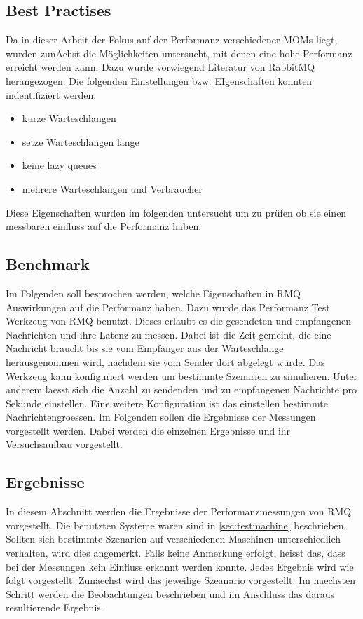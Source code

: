 \subsection{Best Practises}
Da in dieser Arbeit der Fokus auf der Performanz verschiedener MOMs liegt, wurden zunÄchst die Möglichkeiten untersucht, mit denen eine hohe Performanz erreicht werden kann. Dazu wurde vorwiegend Literatur von RabbitMQ herangezogen. Die folgenden Einstellungen bzw. EIgenschaften konnten indentifiziert werden.
\begin{itemize}
    \item kurze Warteschlangen
    \item setze Warteschlangen länge
    \item keine lazy queues
    \item mehrere Warteschlangen und Verbraucher
\end{itemize}
Diese Eigenschaften wurden im folgenden untersucht um zu prüfen ob sie einen messbaren einfluss auf die Performanz haben.
\subsection{Benchmark}
Im Folgenden soll besprochen werden, welche Eigenschaften in RMQ Auswirkungen auf die Performanz haben. Dazu wurde das Performanz Test Werkzeug von RMQ benutzt. Dieses erlaubt es die gesendeten und empfangenen Nachrichten und ihre Latenz zu messen. Dabei ist die Zeit gemeint, die eine Nachricht braucht bis sie vom Empfänger aus der Warteschlange herausgenommen wird, nachdem sie vom Sender dort abgelegt wurde. Das Werkzeug kann konfiguriert werden um bestimmte Szenarien zu simulieren. Unter anderem laesst sich die Anzahl zu sendenden und zu empfangenen Nachrichte pro Sekunde einstellen. Eine weitere Konfiguration ist das einstellen bestimmte Nachrichtengroessen. Im Folgenden sollen die Ergebnisse der Messungen vorgestellt werden. Dabei werden die einzelnen Ergebnisse und ihr Versuchsaufbau vorgestellt.


\subsection{Ergebnisse}
In diesem Abschnitt werden die Ergebnisse der Performanzmessungen von RMQ vorgestellt. Die benutzten Systeme waren sind in \autoref{sec:testmachine} beschrieben. Sollten sich bestimmte Szenarien auf verschiedenen Maschinen unterschiedlich verhalten, wird dies angemerkt. Falls keine Anmerkung erfolgt, heisst das, dass bei der Messungen kein Einfluss erkannt werden konnte. Jedes Ergebnis wird wie folgt vorgestellt: Zunaechst wird das jeweilige Szeanario vorgestellt. Im naechsten Schritt werden die Beobachtungen beschrieben und im Anschluss das daraus resultierende Ergebnis.

